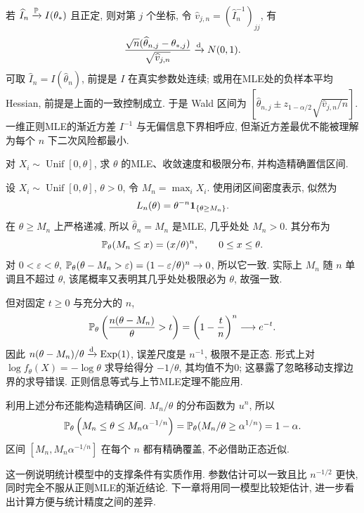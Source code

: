 若 $\widehat I_n\xrightarrow{\mathbb P} I(\theta_*)$ 且正定, 则对第 $j$ 个坐标, 令 $\widehat v_{j,n}=(\widehat I_n^{-1})_{jj}$, 有
\[
 \frac{\sqrt n(\widehat\theta_{n,j}-\theta_{*,j})}{\sqrt{\widehat v_{j,n}}}\xrightarrow{\mathrm d} N(0,1).
\]
可取 $\widehat I_n=I(\widehat\theta_n)$, 前提是 $I$ 在真实参数处连续; 或用在MLE处的负样本平均Hessian, 前提是上面的一致控制成立. 于是 Wald 区间为 $[\widehat\theta_{n,j}\pm z_{1-\alpha/2}\sqrt{\widehat v_{j,n}/n}]$. 一维正则MLE的渐近方差 $I^{-1}$ 与无偏信息下界相呼应, 但渐近方差最优不能被理解为每个 $n$ 下二次风险都最小.

\begin{example}
对 $X_i\sim\operatorname{Unif}[0,\theta]$, 求 $\theta$ 的MLE、收敛速度和极限分布, 并构造精确置信区间.
\end{example}
\begin{solution}
设 $X_i\sim\operatorname{Unif}[0,\theta]$, $\theta>0$, 令 $M_n=\max_iX_i$. 使用闭区间密度表示, 似然为
\[
 L_n(\theta)=\theta^{-n}\mathbf 1_{\{\theta\ge M_n\}}.
\]
在 $\theta\ge M_n$ 上严格递减, 所以 $\widehat\theta_n=M_n$ 是MLE, 几乎处处 $M_n>0$. 其分布为
\[
 \mathbb P_\theta(M_n\le x)=(x/\theta)^n,\qquad0\le x\le\theta.
\]
对 $0<\varepsilon<\theta$, $\mathbb P_\theta(\theta-M_n>\varepsilon)=(1-\varepsilon/\theta)^n\to0$, 所以它一致. 实际上 $M_n$ 随 $n$ 单调且不超过 $\theta$, 该尾概率又表明其几乎处处极限必为 $\theta$, 故强一致.

但对固定 $t\ge0$ 与充分大的 $n$,
\[
 \mathbb P_\theta\left(\frac{n(\theta-M_n)}\theta>t\right)
 =\left(1-\frac tn\right)^n\longrightarrow e^{-t}.
\]
因此 $n(\theta-M_n)/\theta\xrightarrow{\mathrm d}\operatorname{Exp}(1)$, 误差尺度是 $n^{-1}$, 极限不是正态. 形式上对 $\log f_\theta(X)=-\log\theta$ 求导给得分 $-1/\theta$, 其均值不为0; 这暴露了忽略移动支撑边界的求导错误. 正则信息等式与上节MLE定理不能应用.

利用上述分布还能构造精确区间. $M_n/\theta$ 的分布函数为 $u^n$, 所以
\[
 \mathbb P_\theta\left(M_n\le\theta\le M_n\alpha^{-1/n}\right)
 =\mathbb P_\theta(M_n/\theta\ge\alpha^{1/n})=1-\alpha.
\]
区间 $[M_n,M_n\alpha^{-1/n}]$ 在每个 $n$ 都有精确覆盖, 不必借助正态近似.
\end{solution}
这一例说明统计模型中的支撑条件有实质作用. 参数估计可以一致且比 $n^{-1/2}$ 更快, 同时完全不服从正则MLE的渐近结论. 下一章将用同一模型比较矩估计, 进一步看出计算方便与统计精度之间的差异.
